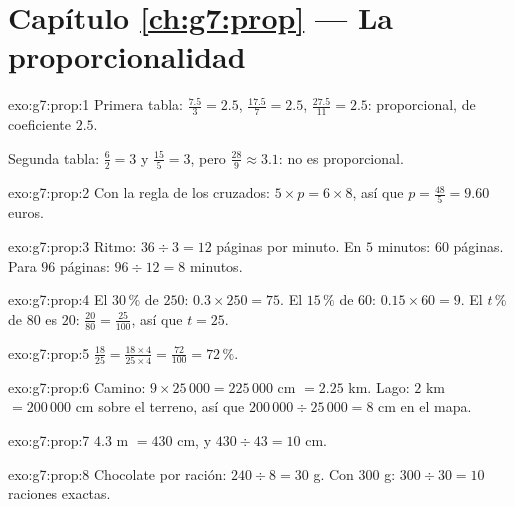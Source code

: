 \section*{Capítulo \ref{ch:g7:prop} --- La proporcionalidad}

\begin{solution}{exo:g7:prop:1}
Primera tabla:  $\frac{7.5}{3} = 2.5$,
$\frac{17.5}{7} = 2.5$, $\frac{27.5}{11} = 2.5$: proporcional,
de coeficiente $2.5$.

Segunda tabla: $\frac62 = 3$ y $\frac{15}{5} = 3$, pero
$\frac{28}{9} \approx 3.1$: no es proporcional.
\end{solution}

\begin{solution}{exo:g7:prop:2}
Con la regla de los  cruzados: $5 \times p = 6 \times 8$, así que
$p = \frac{48}{5} = 9.60$ euros.
\end{solution}

\begin{solution}{exo:g7:prop:3}
Ritmo: $36 \div 3 = 12$ páginas por minuto. En $5$ minutos:
$60$ páginas. Para $96$ páginas: $96 \div 12 = 8$ minutos.
\end{solution}

\begin{solution}{exo:g7:prop:4}
El $30\,\%$ de $250$: $0.3 \times 250 = 75$. \quad
El $15\,\%$ de $60$: $0.15 \times 60 = 9$. \quad
El $t\,\%$ de $80$ es $20$: $\frac{20}{80} = \frac{25}{100}$, así que
$t = 25$.
\end{solution}

\begin{solution}{exo:g7:prop:5}
$\frac{18}{25} = \frac{18 \times 4}{25 \times 4} = \frac{72}{100} =
72\,\%$.
\end{solution}

\begin{solution}{exo:g7:prop:6}
Camino: $9 \times 25\,000 = 225\,000$ cm $= 2.25$ km.
Lago: $2$ km $= 200\,000$ cm sobre el terreno, así que
$200\,000 \div 25\,000 = 8$ cm en el mapa.
\end{solution}

\begin{solution}{exo:g7:prop:7}
$4.3$ m $= 430$ cm, y $430 \div 43 = 10$ cm.
\end{solution}

\begin{solution}{exo:g7:prop:8}
Chocolate por ración: $240 \div 8 = 30$ g. Con $300$ g:
$300 \div 30 = 10$ raciones exactas.
\end{solution}

